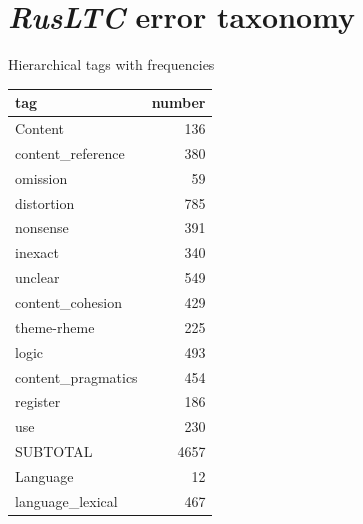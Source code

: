 \chapter{\label{appx:rusltc_err}\textit{RusLTC} error taxonomy}

\begin{multicols}{2}

\noindent Hierarchical tags with frequencies%

\begin{table}[H]
	\centering
	\begin{tabular}{lr}
		\toprule
		tag & number \\
		\midrule
		Content               & 136   \\
		\hspace{1em}content\_reference    & 380   \\
		\hspace{3em}omission              & 59    \\
		\hspace{3em}distortion            & 785   \\
		\hspace{3em}nonsense              & 391   \\
		\hspace{3em}inexact               & 340   \\
		\hspace{3em}unclear               & 549   \\
		\hspace{1em}content\_cohesion     & 429   \\
		\hspace{3em}theme-rheme            & 225   \\
		\hspace{3em}logic                 & 493   \\
		\hspace{1em}content\_pragmatics   & 454   \\
		\hspace{3em}register              & 186   \\
		\hspace{3em}use                   & 230   \\
		SUBTOTAL						  & 4657  \\
		\midrule
		Language              & 12    \\
		\hspace{1em}language\_lexical     & 467   \\

\end{tabular}
\end{table}
\end{multicols}
